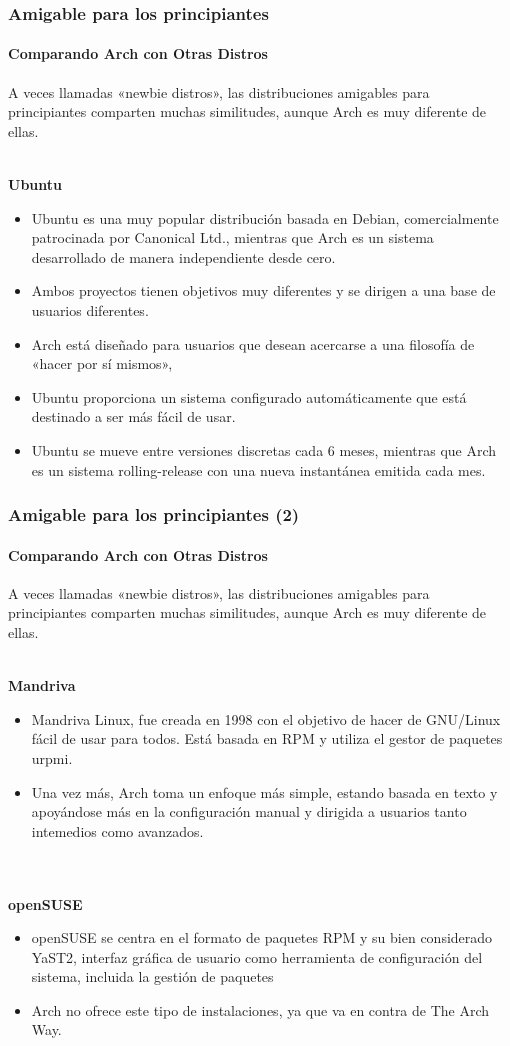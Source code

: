 \documentclass[9pt,t]{beamer}
\begin{document}
\begin{frame}\justifying
  \frametitle{Amigable para los principiantes}
  \framesubtitle{Comparando Arch con Otras Distros}
    A veces llamadas «newbie distros», las distribuciones amigables para principiantes comparten muchas 
    similitudes, aunque Arch es muy diferente de ellas.
    \ \\ \ \\
    {\small
    {\bf Ubuntu}
    \begin{itemize}\justifying
      \item Ubuntu es una muy popular distribución basada en Debian, comercialmente patrocinada 
      por Canonical Ltd., mientras que Arch es un sistema desarrollado de manera independiente desde cero.
      \item Ambos proyectos tienen objetivos muy diferentes y se dirigen a una base de usuarios diferentes.
      \item Arch está diseñado para usuarios que desean acercarse a una filosofía de «hacer por sí mismos», 
      \item Ubuntu proporciona un sistema configurado automáticamente que está destinado a ser más fácil de usar.
      \item Ubuntu se mueve entre versiones discretas cada 6 meses, mientras que Arch es un 
      sistema rolling-release con una nueva instantánea emitida cada mes.
    \end{itemize}
    }
\end{frame}

\begin{frame}\justifying
  \frametitle{Amigable para los principiantes (2)}
  \framesubtitle{Comparando Arch con Otras Distros}
    A veces llamadas «newbie distros», las distribuciones amigables para principiantes comparten muchas 
    similitudes, aunque Arch es muy diferente de ellas.
    \ \\ \ \\
    {\small
    {\bf Mandriva}
    \begin{itemize}\justifying
      \item Mandriva Linux, fue creada en 1998 con el objetivo de hacer de GNU/Linux fácil de usar para todos. 
      Está basada en RPM y utiliza el gestor de paquetes urpmi. 
      \item Una vez más, Arch toma un enfoque más simple, estando basada en texto y apoyándose más en la 
      configuración manual y dirigida a usuarios tanto intemedios como avanzados.
    \end{itemize}
    \ \\ \ \\
    {\bf openSUSE}
    \begin{itemize}\justifying
      \item openSUSE se centra en el formato de paquetes RPM y su bien considerado YaST2, 
      interfaz gráfica de usuario como herramienta de configuración del sistema, incluida la gestión de paquetes
      \item Arch no ofrece este tipo de instalaciones, ya que va en contra de The Arch Way.
    \end{itemize}
    }
\end{frame}
\end{document}

